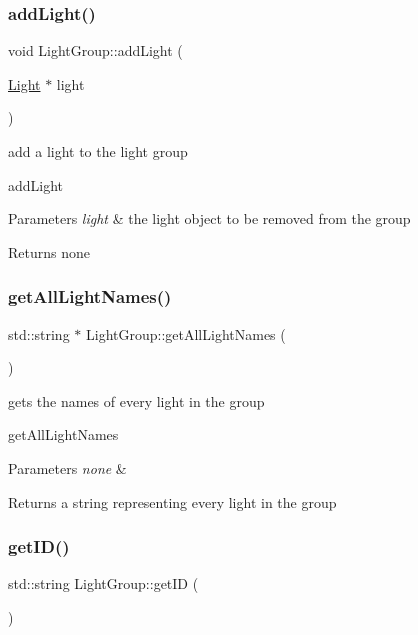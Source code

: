 \subsubsection{\texorpdfstring{add\+Light()}{addLight()}}
{\footnotesize\ttfamily void Light\+Group\+::add\+Light (\begin{DoxyParamCaption}\item[{\hyperlink{class_light}{Light} $\ast$}]{light }\end{DoxyParamCaption})}



add a light to the light group 

add\+Light 
\begin{DoxyParams}{Parameters}
{\em light} & the light object to be removed from the group \\
\hline
\end{DoxyParams}
\begin{DoxyReturn}{Returns}
none 
\end{DoxyReturn}
\mbox{\label{class_light_group_a9e5a81ac9940935dbc87a3a33ebe7fc4}} 
\subsubsection{\texorpdfstring{get\+All\+Light\+Names()}{getAllLightNames()}}
{\footnotesize\ttfamily std\+::string $\ast$ Light\+Group\+::get\+All\+Light\+Names (\begin{DoxyParamCaption}{ }\end{DoxyParamCaption})}



gets the names of every light in the group 

get\+All\+Light\+Names 
\begin{DoxyParams}{Parameters}
{\em none} & \\
\hline
\end{DoxyParams}
\begin{DoxyReturn}{Returns}
a string representing every light in the group 
\end{DoxyReturn}
\mbox{\label{class_light_group_af2a28bb84204d5cd64420ea213e86d8d}} 
\subsubsection{\texorpdfstring{get\+I\+D()}{getID()}}
{\footnotesize\ttfamily std\+::string Light\+Group\+::get\+ID (\begin{DoxyParamCaption}{ }\end{DoxyParamCaption})}



